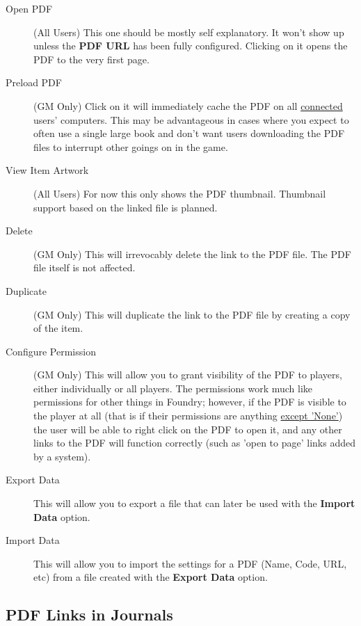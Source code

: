 \documentclass{article}
\begin{document}
    \begin{description}

        \item [Open PDF] (All Users) This one should be mostly self explanatory. It won't show up unless the \textbf{PDF URL} has been fully configured. Clicking on it opens the PDF to the very first page.

        \item [Preload PDF] (GM Only) Click on it will immediately cache the PDF on all \underline{connected} users' computers. This may be advantageous in cases where you expect to often use a single large book and don't want users downloading the PDF files to interrupt other goings on in the game.

        \item [View Item Artwork] (All Users) For now this only shows the PDF thumbnail. Thumbnail support based on the linked file is planned.

        \item [Delete] (GM Only) This will irrevocably delete the link to the PDF file. The PDF file itself is not affected.

        \item [Duplicate] (GM Only) This will duplicate the link to the PDF file by creating a copy of the item.

        \item [Configure Permission] (GM Only) This will allow you to grant visibility of the PDF to players, either individually or all players. The permissions work much like permissions for other things in Foundry; however, if the PDF is visible to the player at all (that is if their permissions are anything \underline{except 'None'}) the user will be able to right click on the PDF to open it, and any other links to the PDF will function correctly (such as 'open to page' links added by a system).

        \item [Export Data] This will allow you to export a file that can later be used with the \textbf{Import Data} option.

        \item [Import Data] This will allow you to import the settings for a PDF (Name, Code, URL, etc) from a file created with the \textbf{Export Data} option.

    \end{description}

    \subsection{PDF Links in Journals}
\end{document}
